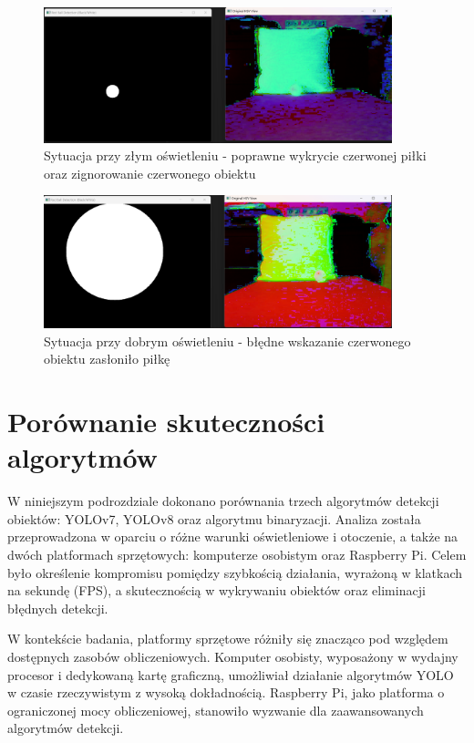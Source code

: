 \documentclass[a4paper,twoside,12pt]{book}
\begin{document}
\begin{figure}[h]
    \centering
    \includegraphics[width=0.9\textwidth]{Images/Porownanie/Binaryzacja/Zrzut ekranu 2025-01-02 193817.png}
    \caption{Sytuacja przy złym oświetleniu - poprawne wykrycie czerwonej piłki oraz zignorowanie czerwonego obiektu}
    \label{fig:Wykrycie piłki10}
\end{figure}
\begin{figure}[h]
    \centering
    \includegraphics[width=0.9\textwidth]{Images/Porownanie/Binaryzacja/Zrzut ekranu 2025-01-02 193917.png}
    \caption{Sytuacja przy dobrym oświetleniu - błędne wskazanie czerwonego obiektu zasłoniło piłkę}
    \label{fig:Wykrycie piłki11}
\end{figure}

\newpage
\section{Porównanie skuteczności algorytmów}

W niniejszym podrozdziale dokonano porównania trzech algorytmów detekcji obiektów: YOLOv7, YOLOv8 oraz algorytmu binaryzacji. Analiza została przeprowadzona w oparciu o różne warunki oświetleniowe i otoczenie, a także na dwóch platformach sprzętowych: komputerze osobistym oraz Raspberry Pi. Celem było określenie kompromisu pomiędzy szybkością działania, wyrażoną w klatkach na sekundę (FPS), a skutecznością w wykrywaniu obiektów oraz eliminacji błędnych detekcji.

W kontekście badania, platformy sprzętowe różniły się znacząco pod względem dostępnych zasobów obliczeniowych. Komputer osobisty, wyposażony w wydajny procesor i dedykowaną kartę graficzną, umożliwiał działanie algorytmów YOLO w czasie rzeczywistym z wysoką dokładnością. Raspberry Pi, jako platforma o ograniczonej mocy obliczeniowej, stanowiło wyzwanie dla zaawansowanych algorytmów detekcji.
\end{document}
